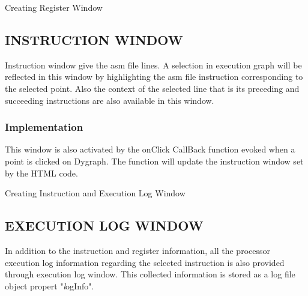 \IncMargin{1em}
\begin{algorithm}[H]
\DontPrintSemicolon
{} 
\BlankLine
{}
\caption{Creating Register Window}
\end{algorithm}\DecMargin{1em}

\subsection {INSTRUCTION WINDOW}

Instruction window give the asm file lines. A selection in execution graph will be reflected in this window by highlighting the asm file instruction corresponding to the selected point. Also the context of the selected line that is its preceding and succeeding instructions are also available in this window.
\subsubsection{Implementation}

This window is also activated by the onClick CallBack function evoked when a point is clicked on Dygraph. The function will update the instruction window set by the HTML code.

\IncMargin{1em}
\begin{algorithm}[H]
\DontPrintSemicolon
{} 
\caption{Creating Instruction and Execution Log Window}
\end{algorithm}\DecMargin{1em}

\subsection {EXECUTION LOG WINDOW}

In addition to the instruction and register information, all the processor execution log information regarding the selected
instruction is also provided through execution log window.  This collected information is stored as a log file object propert "{\emph logInfo}". 

